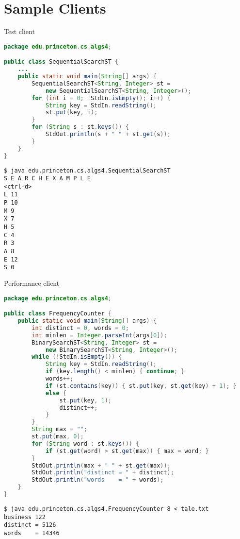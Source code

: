 \documentclass[8pt,a4paper,compress]{beamer}
\begin{document}
\section{Sample Clients}
\begin{frame}[fragile]
Test client
\begin{lstlisting}[language=Java]
package edu.princeton.cs.algs4;

public class SequentialSearchST {
    ...
    public static void main(String[] args) {
        SequentialSearchST<String, Integer> st = 
            new SequentialSearchST<String, Integer>();
        for (int i = 0; !StdIn.isEmpty(); i++) {
            String key = StdIn.readString();
            st.put(key, i);
        }
        for (String s : st.keys()) {
            StdOut.println(s + " " + st.get(s));
        }
    }
}
\end{lstlisting}

\begin{lstlisting}[language={}]
$ java edu.princeton.cs.algs4.SequentialSearchST 
S E A R C H E X A M P L E
<ctrl-d>
L 11
P 10
M 9
X 7
H 5
C 4
R 3
A 8
E 12
S 0
\end{lstlisting}
\end{frame}

\begin{frame}[fragile]
Performance client
\begin{lstlisting}[language=Java]
package edu.princeton.cs.algs4;

public class FrequencyCounter {
    public static void main(String[] args) {
        int distinct = 0, words = 0;
        int minlen = Integer.parseInt(args[0]);
        BinarySearchST<String, Integer> st = 
            new BinarySearchST<String, Integer>();
        while (!StdIn.isEmpty()) {
            String key = StdIn.readString();
            if (key.length() < minlen) { continue; }
            words++;
            if (st.contains(key)) { st.put(key, st.get(key) + 1); }
            else {
                st.put(key, 1);
                distinct++;
            }
        }
        String max = "";
        st.put(max, 0);
        for (String word : st.keys()) {
            if (st.get(word) > st.get(max)) { max = word; }
        }
        StdOut.println(max + " " + st.get(max));
        StdOut.println("distinct = " + distinct);
        StdOut.println("words    = " + words);
    }
}
\end{lstlisting}

\begin{lstlisting}[language={}]
$ java edu.princeton.cs.algs4.FrequencyCounter 8 < tale.txt 
business 122
distinct = 5126
words    = 14346
\end{lstlisting}
\end{frame}
\end{document}
